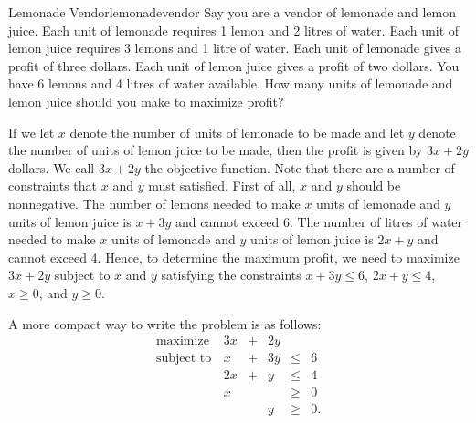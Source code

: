 \begin{example}{Lemonade Vendor}{lemonadevendor}
Say you are a vendor of lemonade and lemon juice. Each unit of lemonade
requires 1 lemon and 2 litres of water. Each unit of lemon juice
requires 3 lemons and 1 litre of water. Each unit of lemonade gives a
profit of three dollars. Each unit of lemon juice gives a profit of two
dollars. You have 6 lemons and 4 litres of water available. How many
units of lemonade and lemon juice should you make to maximize profit?


If we let \(x\) denote the number of units of lemonade to be made and
let \(y\) denote the number of units of lemon juice to be made, then the
profit is given by \(3x + 2y\) dollars. We call \(3x + 2y\) the
objective function. Note that there are a number of constraints that
\(x\) and \(y\) must satisfied. First of all, \(x\) and \(y\) should be
nonnegative. The number of lemons needed to make \(x\) units of lemonade
and \(y\) units of lemon juice is \(x+3y\) and cannot exceed 6. The
number of litres of water needed to make \(x\) units of lemonade and
\(y\) units of lemon juice is \(2x+y\) and cannot exceed 4. Hence, to
determine the maximum profit, we need to maximize \(3x + 2y\) subject to
\(x\) and \(y\) satisfying the constraints \(x + 3y \leq 6\),
\(2x + y \leq 4\), \(x \geq 0\), and \(y \geq 0.\)


A more compact way to write the problem is as follows:
\[\begin{array}{rrcrll}
\mbox{maximize } & 3x & + & 2y & \\
\mbox{subject to} 
& x & + & 3y & \leq & 6 \\
& 2x & +&  y & \leq & 4 \\
& x &  & & \geq & 0 \\
& & & y & \geq & 0. \\
\end{array}\]

\end{example}
